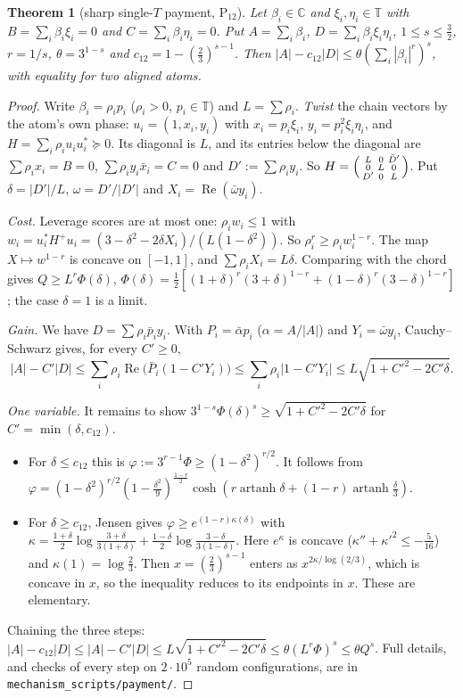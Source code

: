 \documentclass[11pt]{article}
\newtheorem{theorem}{Theorem}
\theoremstyle{definition}
\renewcommand{\Re}{\operatorname{Re}}
\begin{document}
\begin{theorem}[sharp single-$T$ payment, P$_{12}$]\label{prop:p12}
Let $\beta_i\in\mathbb C$ and $\xi_i,\eta_i\in\mathbb T$ with $B=\sum_i\beta_i\xi_i=0$ and $C=\sum_i\beta_i\eta_i=0$.  Put $A=\sum_i\beta_i$, $D=\sum_i\beta_i\xi_i\eta_i$, $1\le s\le\frac32$,
$r=1/s$, $\theta=3^{1-s}$ and $c_{12}=1-(\frac23)^{s-1}$.  Then
$|A|-c_{12}|D|\le\theta(\sum_i|\beta_i|^{r})^s$, with equality for two aligned atoms.
\end{theorem}
\begin{proof}
Write $\beta_i=\rho_ip_i$ ($\rho_i>0$, $p_i\in\mathbb T$) and $L=\sum\rho_i$.  \emph{Twist} the chain vectors by the atom's own phase:
$u_i=(1,x_i,y_i)$ with $x_i=p_i\xi_i$, $y_i=p_i^2\xi_i\eta_i$, and $H=\sum_i\rho_iu_iu_i^*\succeq0$.  Its diagonal is $L$, and its entries below the diagonal
are $\sum\rho_ix_i=B=0$, $\sum\rho_iy_i\bar x_i=C=0$ and $D':=\sum\rho_iy_i$.  So $H=\begin{psmallmatrix}L&0&\bar D'\\0&L&0\\D'&0&L\end{psmallmatrix}$.  Put $\delta=|D'|/L$, $\omega=D'/|D'|$
and $X_i=\Re(\bar\omega y_i)$.

\emph{Cost.}  Leverage scores are at most one: $\rho_iw_i\le1$ with $w_i=u_i^*H^{+}u_i=(3-\delta^2-2\delta X_i)/(L(1-\delta^2))$.  So $\rho_i^r\ge\rho_iw_i^{1-r}$.  The map
$X\mapsto w^{1-r}$ is concave on $[-1,1]$, and $\sum\rho_iX_i=L\delta$.  Comparing with the chord gives
$Q\ge L^r\Phi(\delta)$, $\Phi(\delta)=\frac12[(1+\delta)^r(3+\delta)^{1-r}+(1-\delta)^r(3-\delta)^{1-r}]$; the case $\delta=1$ is a limit.

\emph{Gain.}  We have $D=\sum\rho_i\bar p_iy_i$.  With $P_i=\bar\alpha p_i$ ($\alpha=A/|A|$) and $Y_i=\bar\omega y_i$, Cauchy--Schwarz gives, for every $C'\ge0$,
\[|A|-C'|D|\le\sum_i\rho_i\Re\big(\bar P_i(1-C'Y_i)\big)\le\sum_i\rho_i|1-C'Y_i|\le L\sqrt{1+C'^2-2C'\delta}.\]

\emph{One variable.}  It remains to show $3^{1-s}\Phi(\delta)^s\ge\sqrt{1+C'^2-2C'\delta}$ for $C'=\min(\delta,c_{12})$.
\begin{itemize}
\item For $\delta\le c_{12}$ this is $\varphi:=3^{r-1}\Phi\ge(1-\delta^2)^{r/2}$.  It follows from
$\varphi=(1-\delta^2)^{r/2}(1-\frac{\delta^2}9)^{\frac{1-r}2}\cosh(r\operatorname{artanh}\delta+(1-r)\operatorname{artanh}\frac\delta3)$.
\item For $\delta\ge c_{12}$, Jensen gives $\varphi\ge e^{(1-r)\kappa(\delta)}$ with $\kappa=\frac{1+\delta}2\log\frac{3+\delta}{3(1+\delta)}+\frac{1-\delta}2\log\frac{3-\delta}{3(1-\delta)}$.  Here $e^\kappa$ is concave
($\kappa''+\kappa'^2\le-\frac5{16}$) and $\kappa(1)=\log\frac23$.  Then $x=(\frac23)^{s-1}$ enters as $x^{2\kappa/\log(2/3)}$, which is concave in $x$, so the inequality reduces to its
endpoints in $x$.  These are elementary.
\end{itemize}
Chaining the three steps: $|A|-c_{12}|D|\le|A|-C'|D|\le L\sqrt{1+C'^2-2C'\delta}\le\theta(L^r\Phi)^s\le\theta Q^s$.  Full details, and checks of every step on $2\cdot10^5$ random
configurations, are in \texttt{mechanism\_scripts/payment/}.
\end{proof}
\end{document}
